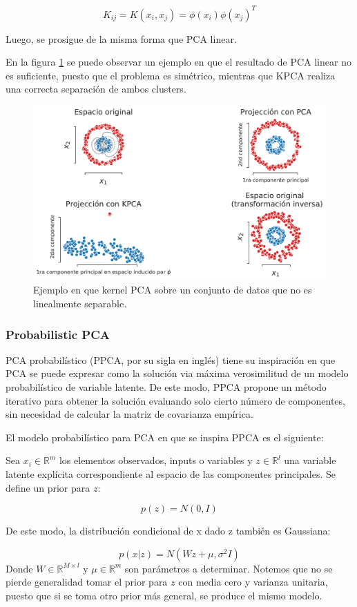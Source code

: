 $$
K_{ij} = K(x_i,x_j) = \phi(x_i)\phi(x_j)^T
$$

Luego, se prosigue de la misma forma que PCA linear.

En la figura \ref{fig:kpca} se puede observar un ejemplo en que el resultado de PCA linear no es suficiente, puesto que el problema es simétrico, mientras que KPCA realiza una correcta separación de ambos clusters.

\begin{figure}[ht]
    \centering
    \includegraphics[width=0.7\linewidth]{img/cap7_kpca.pdf}
    \caption{Ejemplo en que kernel PCA sobre un conjunto de datos que no es linealmente separable.}
    \label{fig:kpca}
\end{figure}

\subsubsection{Probabilistic PCA}
PCA probabilístico (PPCA, por su sigla en inglés) tiene su inspiración en que PCA se puede expresar como la solución via máxima verosimilitud de un modelo probabilístico de variable latente. De este modo, PPCA propone un método iterativo para obtener la solución evaluando solo cierto número de componentes, sin necesidad de calcular la matriz de covarianza empírica.

El modelo probabilístico para PCA en que se inspira PPCA es el siguiente:

Sea $x_i\in \mathbb{R}^m$ los elementos observados, inputs o variables y $z\in \mathbb{R}^l$ una variable latente explícita correspondiente al espacio de las componentes principales. Se define un prior para $z$:

\begin{equation}
p(z) = N(0,I)
\end{equation}

De este modo, la distribución condicional de x dado z también es Gaussiana:

\begin{equation}
p(x|z) = N(Wz+\mu,\sigma^2I)
\end{equation}
Donde $W\in \mathbb{R}^{M\times l}$ y $\mu \in \mathbb{R}^m$ son parámetros a determinar. Notemos que no se pierde generalidad tomar el prior para $z$ con media cero y varianza unitaria, puesto que si se toma otro prior más general, se produce el mismo modelo.

